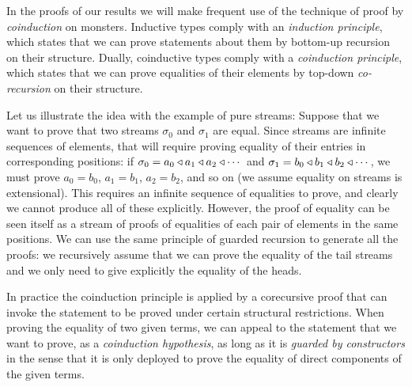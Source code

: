 In the proofs of our results we will make frequent use of the technique of proof by {\em coinduction} on monsters.
Inductive types comply with an {\em induction principle}, which states that we can prove statements about them by bottom-up recursion on their structure.
Dually, coinductive types comply with a {\em coinduction principle}, which states that we can prove equalities of their elements by top-down {\em co-recursion} on their structure.

Let us illustrate the idea with the example of pure streams:
Suppose that we want to prove that two streams $\sigma_0$ and $\sigma_1$ are equal.
Since streams are infinite sequences of elements, that will require proving equality of their entries in corresponding positions: if $\sigma_0 = a_0\triangleleft a_1\triangleleft a_2\triangleleft \cdots$ and  $\sigma_1 = b_0\triangleleft b_1\triangleleft b_2\triangleleft \cdots$, we must prove $a_0 = b_0$, $a_1 = b_1$, $a_2=b_2$, and so on (we assume equality on streams is extensional).
This requires an infinite sequence of equalities to prove, and clearly we cannot produce all of these explicitly.
However, the proof of equality can be seen itself as a stream of proofs of equalities of each pair of elements in the same positions.
We can use the same principle of guarded recursion to generate all the proofs: we recursively assume that we can prove the equality of the tail streams and we only need to give explicitly the equality of the heads.

In practice the coinduction principle is applied by a corecursive proof that can invoke the statement to be proved under certain structural restrictions.
When proving the equality of two given terms, we can appeal to the statement that we want to prove, as a {\em coinduction hypothesis}, as long as it is {\em guarded by constructors} in the sense that it is only deployed to prove the equality of direct components of the given terms.

